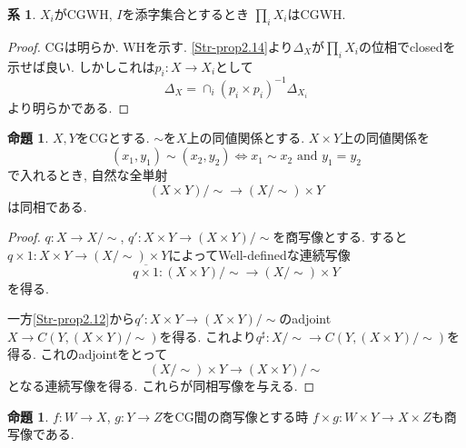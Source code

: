 \documentclass[dvipdfmx,a4paper,11pt]{article}
\theoremstyle{definition}
\newtheorem{prop}[thm]{命題}
\newtheorem{cor}[thm]{系}
\begin{document}
 \begin{tcolorbox}
 [colback = white, colframe = green!35!black, fonttitle = \bfseries,breakable = true]
\begin{cor}\cite[Cor2.16]{Str}
\label{Str^cor2.16}
$X_i$がCGWH, $I$を添字集合とするとき
$\prod_i X_i$はCGWH.
\end{cor}
\end{tcolorbox}

\begin{proof}
CGは明らか. WHを示す.
\ref{Str-prop2.14}より$\Delta_{X}$が$\prod_i X_i$の位相でclosedを示せば良い.
しかしこれは$p_i : X \to X_i$として
$$
\Delta_X = \cap_{i} (p_i \times p_i)^{-1}\Delta_{X_i}
$$
より明らかである.
\end{proof}

 \begin{tcolorbox}
 [colback = white, colframe = green!35!black, fonttitle = \bfseries,breakable = true]
\begin{prop}\cite[Prop2.17]{Str}
\label{Str-prop2.17}
$X,Y$をCGとする. 
$\sim$を$X$上の同値関係とする. 
$X \times Y$上の同値関係を
$$
(x_1,y_1) \sim (x_2, y_2) \Leftrightarrow
x_1 \sim x_2 \text{ and } y_1 = y_2 
$$
で入れるとき, 自然な全単射
$$
(X \times Y)/\sim \to (X/\sim) \times Y
$$
は同相である. 
\end{prop}
\end{tcolorbox}

\begin{proof}
$q : X \to X/\sim$, $q' : X \times Y \to (X \times Y)/\sim$を商写像とする.
すると$q \times 1 : X \times Y \to (X/\sim)\times Y$によってWell-definedな連続写像
$$
\overline{q \times 1} : (X \times Y)/\sim \to (X/\sim) \times Y
$$
を得る.

一方\ref{Str-prop2.12}から$q' :  X \times Y \to (X \times Y)/\sim$のadjoint
$ X \to C(Y , (X \times Y)/\sim)$を得る. これより$q^{\sharp} : X/\sim \to C(Y , (X \times Y)/\sim)$を得る. 
これのadjointをとって
$$
(X/\sim) \times Y \to (X \times Y)/\sim
$$
となる連続写像を得る. これらが同相写像を与える.
\end{proof}

 \begin{tcolorbox}
 [colback = white, colframe = green!35!black, fonttitle = \bfseries,breakable = true]
\begin{prop}\cite[Prop 2.20]{Str}
\label{Str-prop2.20}
$f : W \to X$, $g : Y \to Z$をCG間の商写像とする時
$f \times g : W \times Y \to X \times Z$も商写像である. 
\end{prop}
\end{tcolorbox}
\end{document}
